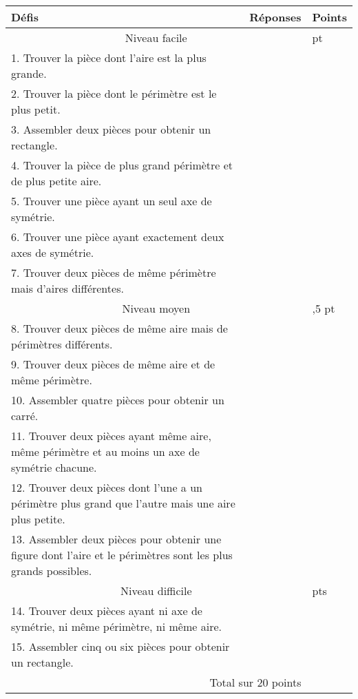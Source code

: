 \begin{enigme}
    {\renewcommand{\arraystretch}{1.75}
    \begin{tabular}{|p{11cm}|>{\centering\arraybackslash}p{3cm}|>{\centering\arraybackslash}p{1cm}|}
    \hline
    Défis & Réponses & Points \\
    \hline
    \multicolumn{2}{|c|}{Niveau facile} & 1 pt \\
    \hline
    1. Trouver la pièce dont l'aire est la plus grande. & & \\
    \hline
    2. Trouver la pièce dont le périmètre est le plus petit. & & \\
    \hline
    3. Assembler deux pièces pour obtenir un rectangle. & & \\
    \hline
    4. Trouver la pièce de plus grand périmètre et de plus petite aire. & & \\
    \hline
    5. Trouver une pièce ayant un seul axe de symétrie. & & \\
    \hline
    6. Trouver une pièce ayant exactement deux axes de symétrie. & & \\
    \hline
    7. Trouver deux pièces de même périmètre mais d'aires différentes. & & \\
    \hline
    \hline
    \multicolumn{2}{|c|}{Niveau moyen} & 1,5 pt \\
    \hline
    8. Trouver deux pièces de même aire mais de périmètres différents. & & \\
    \hline
    9. Trouver deux pièces de même aire et de même périmètre. & & \\
    \hline
    10. Assembler quatre pièces pour obtenir un carré. & & \\
    \hline
    11. Trouver deux pièces ayant même aire, même périmètre et au moins un axe de symétrie chacune. & & \\
    \hline
    12. Trouver deux pièces dont l'une a un périmètre plus grand que l'autre mais une aire plus petite. & & \\
    \hline
    13. Assembler deux pièces pour obtenir une figure dont l'aire et le périmètres sont les plus grands possibles. & & \\
    \hline
    \hline
    \multicolumn{2}{|c|}{Niveau difficile} & 2 pts \\
    \hline
    14. Trouver deux pièces ayant ni axe de symétrie, ni même périmètre, ni même aire. & & \\
    \hline
    15. Assembler cinq ou six pièces pour obtenir un rectangle. & & \\
    \hline
    \hline
    \multicolumn{2}{|r|}{Total sur 20 points} & \\
    \hline
    \end{tabular}}
\end{enigme}  
%     
